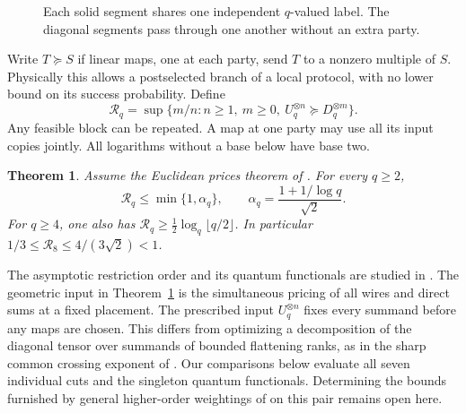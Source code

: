 \documentclass[11pt]{article}
\newtheorem{theorem}{Theorem}
\newcommand{\rate}{\mathcal R}
\begin{document}
\begin{figure}[ht]
\centering
{}
\caption{Each solid segment shares one independent \(q\)-valued label.
The diagonal segments pass through one another without an extra party.}
\label{fig:pairings}
\end{figure}

Write \(T\succeq S\) if linear maps, one at each party, send \(T\) to a
nonzero multiple of \(S\). Physically this allows a postselected branch of
a local protocol, with no lower bound on its success probability. Define
\[
 \rate_q=\sup\bigl\{m/n: n\ge1,\ m\ge0,\
                     U_q^{\otimes n}\succeq D_q^{\otimes m}\bigr\}.
\]
Any feasible block can be repeated. A map at one party may use all its input
copies jointly. All logarithms without a base below have base two.

\begin{theorem}\label{thm:square}
Assume the Euclidean prices theorem of \cite[Thm.~1.1]{price}.
For every \(q\ge2\),
\[
 \rate_q\le \min\{1,\alpha_q\},\qquad
 \alpha_q=\frac{1+1/\log q}{\sqrt2}.
\]
For \(q\ge4\), one also has
\(\rate_q\ge\tfrac12\log_q\lfloor q/2\rfloor\).
In particular \(1/3\le\rate_8\le4/(3\sqrt2)<1\).
\end{theorem}

The asymptotic restriction order and its quantum functionals are studied
in \cite{cvz,botero}. The geometric input in Theorem~\ref{thm:square}
is the simultaneous pricing of all wires and direct sums at a fixed
placement. The prescribed input \(U_q^{\otimes n}\) fixes every summand
before any maps are chosen. This differs from optimizing a decomposition of
the diagonal tensor over summands of bounded flattening ranks, as in the
sharp common crossing exponent of \cite{price}. Our comparisons below
evaluate all seven individual cuts and the singleton quantum functionals.
Determining the bounds furnished by general higher-order weightings
of \cite{botero} on this pair remains open here.
\end{document}
